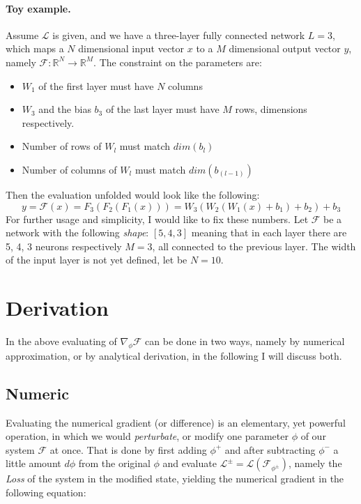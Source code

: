 \paragraph{Toy example.} Assume $\mathcal{L}$ is given, and we have a three-layer fully connected network $L=3$, which maps a $N$ dimensional input vector $x$ to a $M$ dimensional output vector $y$, namely $\mathcal{F}:\mathbb{R}^N \rightarrow \mathbb{R}^M$. The constraint on the parameters are:
\begin{itemize}
    \item[] $W_1$ of the first layer must have $N$ columns
    \item[] $W_3$ and the bias $b_3$ of the last layer must have $M$ rows, dimensions respectively.
    \item[] Number of rows of $W_l$ must match $dim(b_l)$
    \item[] Number of columns of $W_l$ must match $dim(b_{(l-1)})$
\end{itemize} 
Then the evaluation unfolded would look like the following: 
$$y = \mathcal{F}(x) = F_3(F_2(F_1(x))) = W_3(W_2(W_1(x)+b_1)+b_2)+b_3$$
For further usage and simplicity, I would like to fix these numbers.
Let $\mathcal{F}$ be a network with the following \emph{shape}: $\left[5, 4, 3\right] $
meaning that in each layer there are 5, 4, 3 neurons respectively $M=3$, all connected to the previous layer. The width of the input layer is not yet defined, let be $N=10$.
\section{Derivation} In the above evaluating of $\nabla_\phi \mathcal{F}$ can be done in two ways, namely by numerical approximation, or by analytical derivation, in the following I will discuss both.

\subsection{Numeric} Evaluating the numerical gradient (or difference) is an elementary, yet powerful operation, in which we would \emph{perturbate}, or modify one parameter $\phi$ of our system $\mathcal{F}$ at once.
That is done by first adding $\phi^+$ and after subtracting $\phi^-$ a little amount $d\phi$ from the original $\phi$ and evaluate $\mathcal{L}^{\pm}=\mathcal{L}(\mathcal{F}_{\phi^{\pm}})$, namely the \emph{Loss} of the system in the modified state, yielding the numerical gradient in the following equation:

